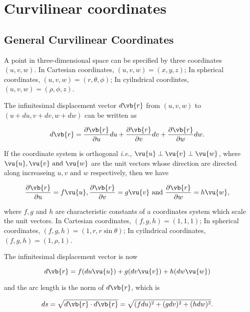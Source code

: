 \documentclass[english,a4paper,12pt]{report}
\begin{document}
\section{Curvilinear coordinates}

\subsection{General Curvilinear Coordinates}

A point in three-dimensional space can be specified by three coordinates \((u,v,w)\). In Cartesian coordinates, \((u,v,w) = (x,y,z)\); In spherical coordinates, \((u,v,w) = (r, \theta, \phi)\); In cyilndrical coordintes, \((u,v,w) = (\rho, \phi, z)\). 

The infinitesimal displacement vector \(d \vb{r} \)  from \((u,v,w)\) to \((u+du, v+dv, w+dw)\) can be written as

\begin{equation} 
	d\vb{r} = \frac{\partial \vb{r} }{\partial u} du + \frac{\partial \vb{r} }{\partial v}dv + \frac{\partial \vb{r} }{\partial w}dw. 
\end{equation}

If the coordinate system is orthogonal \textit{i.e.,} \(\vu{u} \perp \vu{v} \perp \vu{w}\), where \(\vu{u} ,\vu{v} \text { and } \vu{w} \) are the unit vectors whose direction are directed along increaseing \(u, v \text { and } w\) respectively, then we have

\begin{equation}
    \frac{\partial \vb{r} }{\partial u} = f \vu{u}, \frac{\partial \vb{r} }{\partial v} = g \vu{v}  \text { and } \frac{\partial \vb{r} }{\partial w} = h \vu{w}  ,
\end{equation}

where \(f,g\) and \(h\) are characteristic constants of a coordinates system which scale the unit vectors. In Cartesian coordinates, \((f,g,h) = (1,1,1)\); In spherical coordinates, \((f,g,h) = (1,r,r\sin{\theta})\); In cyilndrical coordinates, \((f,g,h) = (1,\rho ,1)\).
	
The infinitesimal displacement vector is now 

\begin{equation}
    d \vb{r} = f(du\vu{u}) + g(dv\vu{v}) + h(dw\vu{w}) \label{dl} 
\end{equation}

and the arc length is the norm of \(d \vb{r} \), which is 

\begin{equation}
    ds = \sqrt{d \vb{r} \cdot d \vb{r} } = \sqrt{(fdu)^2 + (gdv)^2 + (hdw)^2}.  
\end{equation}
\end{document}
